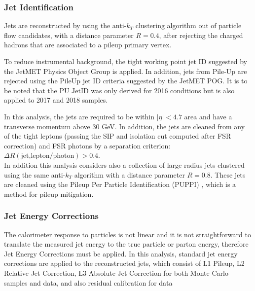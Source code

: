 \subsubsection{Jet Identification}

Jets are reconstructed by using the anti-$k_T$ clustering algorithm out of particle flow candidates, with a distance parameter $R = 0.4$, 
after rejecting the charged hadrons that are associated to a pileup primary vertex.

To reduce instrumental background, the tight working point jet ID suggested by the JetMET Physics Object Group is applied.%
In addition, jets from Pile-Up are rejected using the PileUp jet ID criteria suggested by the JetMET POG.%
It is to be noted that the PU JetID was only derived for 2016 conditions but is also applied to 2017 and 2018 samples. 

In this analysis, the jets are required to be within $|\eta| < 4.7$ area and have a transverse momentum above 30 GeV. 
In addition, the jets are cleaned from any of the tight leptons (passing the SIP and isolation cut computed after FSR correction) 
and FSR photons by a separation criterion: $\Delta R(\text{jet,lepton/photon}) > 0.4$.
\\
In addition this analysis considers also a collection of large radius jets clustered using the same anti-$k_T$ algorithm with a distance parameter $R = 0.8$.
These jets are cleaned using the Pileup Per Particle Identification (PUPPI) \cite{Bertolini_2014}, which is a method for pileup mitigation.

\subsubsection{Jet Energy Corrections}

The calorimeter response to particles is not linear
and it is not straightforward to translate the measured jet energy
to the true particle or parton energy, therefore Jet Energy Corrections must be applied.
In this analysis, standard jet energy corrections are applied to the reconstructed jets,
which consist of L1 Pileup, L2 Relative Jet Correction,
L3 Absolute Jet Correction for both Monte Carlo samples and data,
and also residual calibration for data%

